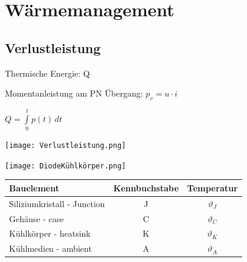\documentclass[german]{latex4ei/latex4ei_sheet}
\begin{document}
\section{Wärmemanagement}
	\begin{sectionbox}
		\subsection{Verlustleistung}
			\begin{bluebox}
				\item Thermische Energie: Q
				\item Momentanleistung am PN Übergang: $p_v = u \cdot i$
				\item $Q = \int\limits_0^t p(t)\,dt$
				\item \texttt{[image: Verlustleistung.png]}
				\item \texttt{[image: DiodeKühlkörper.png]}
			\end{bluebox}
			\begin{tabular}{|l|c|c|}
				\textbf{Bauelement}	& \textbf{Kennbuchstabe} & \textbf{Temperatur}\\
				\hline
				Siliziumkristall - Junction & J & $\vartheta_J$\\
				Gehäuse - case & C & $\vartheta_C$\\
				Kühlkörper - heatsink & K & $\vartheta_K$\\
				Kühlmedien - ambient & A & $\vartheta_A$
				
			\end{tabular}
	\end{sectionbox}
	\vspace{3cm}
\end{document}
